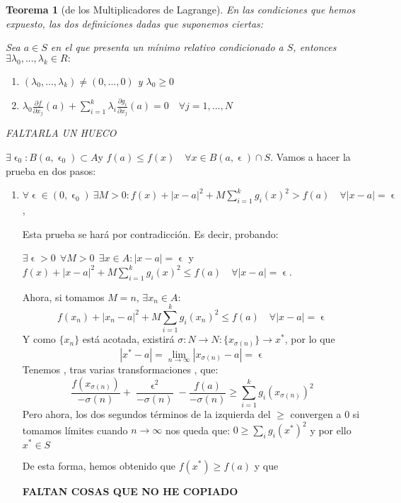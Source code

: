 \documentclass[11pt, a4paper, titlepage]{article}
\makeatletter
\renewenvironment{proof}[1][\proofname] {\vspace{-15pt}\par\pushQED{\qed}\normalfont\topsep6\p@\@plus6\p@\relax\trivlist\item[\hskip\labelsep\it#1\@addpunct{.}]\ignorespaces}{\popQED\endtrivlist\@endpefalse}
\theoremstyle{theorem-style}
\newtheorem*{nth}{Teorema}
\theoremstyle{definition-style}
\theoremstyle{remark-style}
\theoremstyle{example-style}
\newenvironment{nlist}
{\begin{enumerate}
\renewcommand\labelenumi{(\emph{\roman{enumi})}}}
{\end{enumerate}}
\makeatother
\begin{document}
\begin{nth}[de los Multiplicadores de Lagrange]
	En las condiciones que hemos expuesto, las dos definiciones dadas que suponemos ciertas:
	
	Sea $a\in S$ en el que presenta un mínimo relativo condicionado a $S$, entonces $\exists \lambda_0,...,\lambda_k \in R:$
	\begin{nlist}
	\item $(\lambda_0,...,\lambda_k) \ne (0,...,0)$ y $\lambda_0 \geq 0$
	\item  $\lambda_0\frac{\partial f}{\partial x_j}(a)+\sum_{i=1}^k \lambda_i \frac{\partial g_i}{\partial x_j}(a) = 0 \quad \forall j=1,...,N$
\end{nlist}

FALTARLA UN HUECO
\end{nth}
\begin{proof}
	$\exists \upvarepsilon_0 : B(a,\upvarepsilon_0)\subset A $y $f(a) \leq f(x) \quad \forall x \in B(a,\upvarepsilon)\cap S$.
	Vamos a hacer la prueba en dos pasos:
	\begin{enumerate}
	\item $\forall \upvarepsilon \in (0,\upvarepsilon_0) \ \exists M > 0 : f(x) + |x-a|^2 + M \sum_{i=1}^kg_i(x)^2 > f(a) \quad \forall |x-a|= \upvarepsilon$,
	
	Esta prueba se hará por contradicción. Es decir, probando:
	
	$\exists \upvarepsilon > 0 \ \ \forall M> 0 \ \ \exists x\in A: |x-a|=\upvarepsilon$ y $f(x) + |x-a|^2 + M \sum_{i=1}^kg_i(x)^2 \leq f(a) \quad \forall |x-a|= \upvarepsilon$.
	
	Ahora, si tomamos $M=n$, $\exists x_n \in A:$
	\[
	f(x_n) + |x_n-a|^2 + M \sum_{i=1}^kg_i(x_n)^2 \leq f(a) \quad \forall |x-a|= \upvarepsilon
	\]
	Y como $\{x_n\}$ está acotada, existirá $\sigma :N \to N: \{x_{\sigma(n)}\}\to x^{*}$, por lo que 
	\[
	|x^{*}-a|= \lim_{n\to \infty}|x_{\sigma(n)}-a| = \upvarepsilon
	\]
	Tenemos , tras varias transformaciones , que:
	\[
	\frac{f(x_{\sigma(n)})}{-\sigma(n)}+\frac{\upvarepsilon^2}{-\sigma(n)}-\frac{f(a)}{-\sigma(n)} \geq \sum_{i=1}^k g_i(x_{\sigma(n)})^2
	\]
	Pero ahora, los dos segundos términos de la izquierda del $\geq$ convergen a 0 si tomamos límites cuando $n\to \infty$ nos queda que:
	$0 \geq \sum_i g_i (x^*)^2$ y por ello $x^* \in S$
	
	De esta forma, hemos obtenido que $f(x^*) \geq f(a)$ y que
	
	\textbf{FALTAN COSAS QUE NO HE COPIADO}
	

\end{enumerate}
\end{proof}
\end{document}
